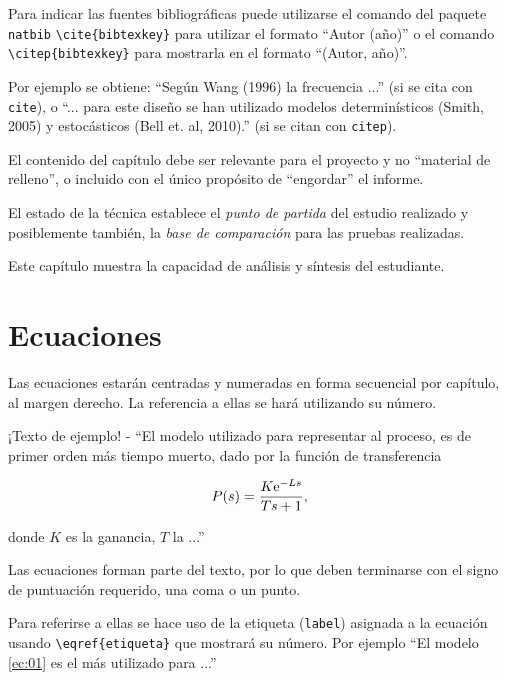 Para indicar las fuentes bibliográficas puede utilizarse el comando del paquete \texttt{natbib} \texttt{\textbackslash cite\{bibtexkey\}} para utilizar el formato ``Autor (año)'' o el comando \texttt{\textbackslash citep\{bibtexkey\}} para mostrarla en el formato ``(Autor, año)''.

Por ejemplo se obtiene: ``Según Wang (1996) la frecuencia ...'' (si se cita con \texttt{cite}), o ``... para este diseño se han utilizado modelos determinísticos (Smith, 2005) y estocásticos (Bell et. al, 2010).''  (si se citan con \texttt{citep}).  

El contenido del capítulo debe ser relevante para el proyecto y no ``material de relleno'', o incluido con el único propósito de ``engordar'' el informe.

El estado de la técnica establece el \emph{punto de partida} del estudio realizado y posiblemente también, la \emph{base de comparación} para las pruebas realizadas.

Este capítulo muestra la capacidad de análisis y síntesis del estudiante.
 
\section{Ecuaciones}
Las ecuaciones estarán centradas y numeradas en forma secuencial por capítulo, al margen derecho.  La referencia a ellas se hará utilizando su número.

¡Texto de ejemplo! - ``El modelo utilizado para representar al proceso, es de primer orden más tiempo muerto, dado por la función de transferencia

\begin{equation}  %
	P(s) = \frac{K \me^{-Ls}}{Ts+1}, \label{ec:01}
\end{equation}

\noindent donde $K$ es la ganancia, $T$ la ...''  

Las ecuaciones forman parte del texto, por lo que deben terminarse con el signo de puntuación requerido, una coma o un punto.

Para referirse a ellas se hace uso de la etiqueta (\texttt{label}) asignada a la ecuación usando \texttt{\textbackslash eqref\{etiqueta\}} que mostrará su número.  Por ejemplo ``El modelo \eqref{ec:01} es el más utilizado para ...''

